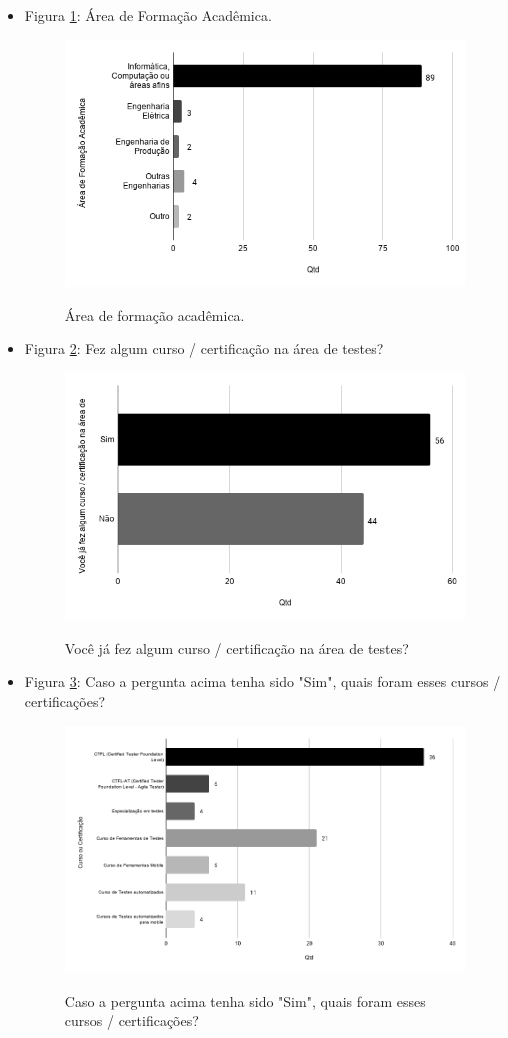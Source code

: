 \begin{itemize}
    
    \item Figura \ref{figure:s_areaformacaoacademica}: Área de Formação Acadêmica.
    \begin{figure}[!htb]
    \centering
    \includegraphics[width=.55\textwidth]{images/s_areaformacaoacademica.png}
    \label{figure:s_areaformacaoacademica}
    \caption{Área de formação acadêmica.}
    \end{figure}
    
    
    \item Figura \ref{figure:s_certificacao}: Fez algum curso / certificação na área de testes?
    \begin{figure}[!htb]
    \centering
    \includegraphics[width=.55\textwidth]{images/s_certificacao.png}
    \label{figure:s_certificacao}
    \caption{Você já fez algum curso / certificação na área de testes?}
    \end{figure}
    
    
    \item Figura \ref{figure:s_certificacaodesc}: Caso a pergunta acima tenha sido "Sim", quais foram esses cursos / certificações?
    \begin{figure}[!htb]
    \centering
    \includegraphics[width=.55\textwidth]{images/s_certificacaodesc.png}
    \label{figure:s_certificacaodesc}
    \caption{Caso a pergunta acima tenha sido "Sim", quais foram esses cursos / certificações?}
    \end{figure}
    

\end{itemize}
